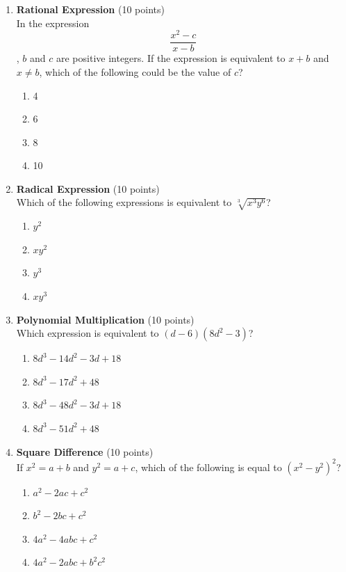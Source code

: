 \begin{enumerate}
  \item \textbf{Rational Expression} (10 points)\\
  In the expression $$\frac{x^{2}-c}{x-b}$$, $b$ and $c$ are positive integers. If the expression is equivalent to $x+b$ and $x \neq b$, which of the following could be the value of $c$?
  \begin{enumerate}[label=(\Alph*)]
    \item 4
    \item 6
    \item 8
    \item 10
  \end{enumerate}
  \begin{subanswer}
  \end{subanswer}

  \newpage

  \item \textbf{Radical Expression} (10 points)\\
  Which of the following expressions is equivalent to $\sqrt[3]{x^3y^6}$?
  \begin{enumerate}[label=(\Alph*)]
    \item $y^{2}$
    \item $xy^{2}$
    \item $y^{3}$
    \item $xy^{3}$
  \end{enumerate}
  \begin{subanswer}
  \end{subanswer}

  \item \textbf{Polynomial Multiplication} (10 points)\\
  Which expression is equivalent to $(d-6)(8d^{2}-3)$?
  \begin{enumerate}[label=(\Alph*)]
    \item $8d^{3}-14d^{2}-3d+18$
    \item $8d^{3}-17d^{2}+48$
    \item $8d^{3}-48d^{2}-3d+18$
    \item $8d^{3}-51d^{2}+48$
  \end{enumerate}
  \begin{subanswer}
  \end{subanswer}

  \item \textbf{Square Difference} (10 points)\\
  If $x^{2}=a+b$ and $y^{2}=a+c$, which of the following is equal to $(x^{2}-y^{2})^{2}$?
  \begin{enumerate}[label=(\Alph*)]
    \item $a^{2}-2ac+c^{2}$
    \item $b^{2}-2bc+c^{2}$
    \item $4a^{2}-4abc+c^{2}$
    \item $4a^{2}-2abc+b^{2}c^{2}$
  \end{enumerate}
  \begin{subanswer}
  \end{subanswer}


\end{enumerate}
